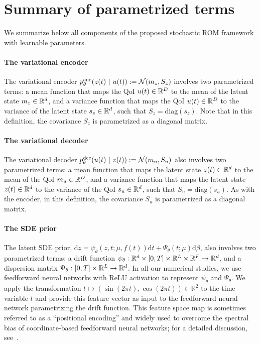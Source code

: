 \documentclass{article}
\begin{document}
	\section{Summary of parametrized terms} \label{sec:modules}
	We summarize below all components of the proposed stochastic ROM framework with learnable parameters. 
	
	\paragraph{The variational encoder} The variational encoder $p_{\theta}^{\rm enc}(z(t)\ |\ u(t)) := \mathcal{N}(m_z, S_z)$ involves two parametrized terms: a mean function that maps the QoI ${u}(t) \in \mathbb{R}^{D}$ to the mean of the latent state  $m_z \in \mathbb{R}^{d}$, and a variance function that maps the QoI ${u}(t) \in \mathbb{R}^{D}$ to the variance of the latent state  $s_z \in \mathbb{R}^{d}$, such that $S_z = \text{diag}(s_z)$. Note that in this definition, the covariance $S_z$ is parametrized as a diagonal matrix.
	
	\paragraph{The variational decoder} The variational decoder $p_{\theta}^{\rm dec}(u(t)\ |\ z(t)) := \mathcal{N}(m_u, S_u)$ also involves two parametrized terms: a mean function that maps the latent state ${z}(t) \in \mathbb{R}^{d}$ to the mean of the QoI $m_u \in \mathbb{R}^{D}$, and a variance function that maps the latent state ${z}(t) \in \mathbb{R}^{d}$ to the variance of the QoI $s_u \in \mathbb{R}^{d}$, such that $S_u = \text{diag}(s_u)$. As with the encoder, in this definition, the covariance $S_u$ is parametrized as a diagonal matrix.
	
	\paragraph{The SDE prior} The latent SDE prior, $\text{d}z = \psi_{\theta} (z, t; \mu, f(t)) \text{d}t + \Psi_{\theta}(t; \mu) \text{d}\beta$, also involves two parametrized terms: a drift function $\psi_{\theta} : \mathbb{R}^{d} \times [0,T] \times \mathbb{R}^{L} \times \mathbb{R}^{F} \to \mathbb{R}^{d}$, and a dispersion matrix $\Psi_{\theta}: [0,T] \times \mathbb{R}^{L} \to \mathbb{R}^{d}$. In all our numerical studies, we use feedforward neural networks with {\sf ReLU} activation to represent $\psi_\theta$ and $\Psi_\theta$. We apply the transformation $t \mapsto (\sin(2\pi t), \cos(2\pi t)) \in \mathbb{R}^2$ to the time variable $t$ and provide this feature vector as input to the feedforward neural network parametrizing the drift function. This feature space map is sometimes referred to as a ``positional encoding'' and widely used to overcome the spectral bias of coordinate-based feedforward neural networks; for a detailed discussion, see~\cite{mildenhall2020nerf,tancik2020fourfeat}.
	
\end{document}
